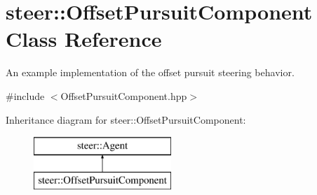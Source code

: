 \hypertarget{classsteer_1_1_offset_pursuit_component}{\section{steer\-:\-:Offset\-Pursuit\-Component Class Reference}
\label{classsteer_1_1_offset_pursuit_component}
}


An example implementation of the offset pursuit steering behavior.  




{\ttfamily \#include $<$Offset\-Pursuit\-Component.\-hpp$>$}

Inheritance diagram for steer\-:\-:Offset\-Pursuit\-Component\-:\begin{figure}[H]
\begin{center}
\leavevmode
\includegraphics[height=2.000000cm]{classsteer_1_1_offset_pursuit_component}
\end{center}
\end{figure}
